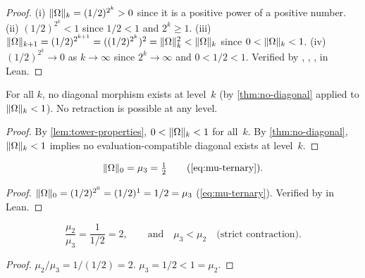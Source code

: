 \begin{proof}
(i) $\|\Omega\|_k = (1/2)^{2^k} > 0$ since it is a positive power of
a positive number.
(ii) $(1/2)^{2^k} < 1$ since $1/2 < 1$ and $2^k \ge 1$.
(iii) $\|\Omega\|_{k+1} = (1/2)^{2^{k+1}} = ((1/2)^{2^k})^2 =
\|\Omega\|_k^2 < \|\Omega\|_k$ since $0 < \|\Omega\|_k < 1$.
(iv) $(1/2)^{2^k} \to 0$ as $k\to\infty$ since $2^k\to\infty$ and
$0 < 1/2 < 1$.
Verified by , ,
,  in Lean.
\end{proof}


\begin{corollary}\label{cor:no-diagonal-tower}
For all $k$, no diagonal morphism exists at level~$k$ (by
\cref{thm:no-diagonal} applied to $\|\Omega\|_k < 1$).
No retraction is possible at any level.
\end{corollary}

\begin{proof}
By \cref{lem:tower-properties}, $0 < \|\Omega\|_k < 1$ for
all~$k$.  By \cref{thm:no-diagonal}, $\|\Omega\|_k < 1$
implies no evaluation-compatible diagonal exists at level~$k$.
\end{proof}


\begin{proposition}\label{prop:tower-base}
\begin{equation}\label{eq:tower-base}
  \norm{\Omega}_0 = \mu_3 = \tfrac{1}{2}
  \qquad\text{(\cref{eq:mu-ternary})}.
\end{equation}
\end{proposition}

\begin{proof}
$\|\Omega\|_0 = (1/2)^{2^0} = (1/2)^1 = 1/2 = \mu_3$
(\cref{eq:mu-ternary}).
Verified by  in Lean.
\end{proof}


\begin{proposition}\label{prop:contraction-factor}
\begin{equation}\label{eq:contraction-factor}
  \frac{\mu_2}{\mu_3} = \frac{1}{1/2} = 2,
  \qquad\text{and}\quad
  \mu_3 < \mu_2 \quad\text{(strict contraction)}.
\end{equation}
\end{proposition}

\begin{proof}
$\mu_2/\mu_3 = 1/(1/2) = 2$.  $\mu_3 = 1/2 < 1 = \mu_2$.
\end{proof}


